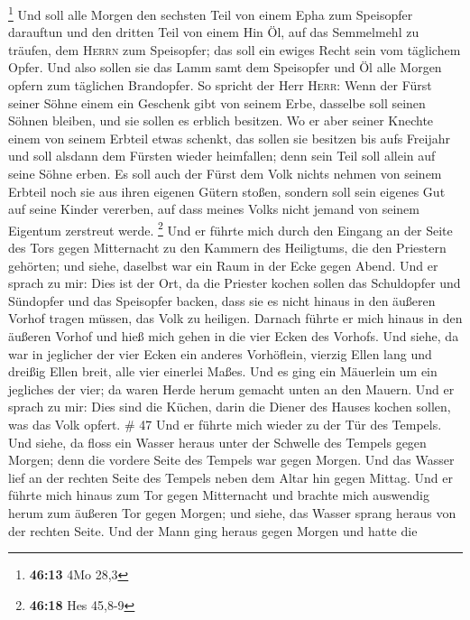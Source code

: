 \footnote{\textbf{46:13} 4Mo 28,3}  Und soll alle Morgen
den sechsten Teil von einem Epha zum Speisopfer darauftun und den
dritten Teil von einem Hin Öl, auf das Semmelmehl zu träufen, dem
\textsc{Herrn} zum Speisopfer; das soll ein ewiges Recht sein vom
täglichem Opfer.  Und also sollen sie das Lamm samt dem
Speisopfer und Öl alle Morgen opfern zum täglichen Brandopfer.
 So spricht der Herr \textsc{Herr}: Wenn der Fürst seiner
Söhne einem ein Geschenk gibt von seinem Erbe, dasselbe soll seinen
Söhnen bleiben, und sie sollen es erblich besitzen.  Wo
er aber seiner Knechte einem von seinem Erbteil etwas schenkt, das
sollen sie besitzen bis aufs Freijahr und soll alsdann dem Fürsten
wieder heimfallen; denn sein Teil soll allein auf seine Söhne erben.
 Es soll auch der Fürst dem Volk nichts nehmen von seinem
Erbteil noch sie aus ihren eigenen Gütern stoßen, sondern soll sein
eigenes Gut auf seine Kinder vererben, auf dass meines Volks nicht
jemand von seinem Eigentum zerstreut werde. \footnote{\textbf{46:18} Hes
  45,8-9}  Und er führte mich durch den Eingang an der
Seite des Tors gegen Mitternacht zu den Kammern des Heiligtums, die den
Priestern gehörten; und siehe, daselbst war ein Raum in der Ecke gegen
Abend.  Und er sprach zu mir: Dies ist der Ort, da die
Priester kochen sollen das Schuldopfer und Sündopfer und das Speisopfer
backen, dass sie es nicht hinaus in den äußeren Vorhof tragen müssen,
das Volk zu heiligen.  Darnach führte er mich hinaus in
den äußeren Vorhof und hieß mich gehen in die vier Ecken des Vorhofs.
 Und siehe, da war in jeglicher der vier Ecken ein
anderes Vorhöflein, vierzig Ellen lang und dreißig Ellen breit, alle
vier einerlei Maßes.  Und es ging ein Mäuerlein um ein
jegliches der vier; da waren Herde herum gemacht unten an den Mauern.
 Und er sprach zu mir: Dies sind die Küchen, darin die
Diener des Hauses kochen sollen, was das Volk opfert. \# 47
 Und er führte mich wieder zu der Tür des Tempels. Und
siehe, da floss ein Wasser heraus unter der Schwelle des Tempels gegen
Morgen; denn die vordere Seite des Tempels war gegen Morgen. Und das
Wasser lief an der rechten Seite des Tempels neben dem Altar hin gegen
Mittag.  Und er führte mich hinaus zum Tor gegen
Mitternacht und brachte mich auswendig herum zum äußeren Tor gegen
Morgen; und siehe, das Wasser sprang heraus von der rechten Seite.
 Und der Mann ging heraus gegen Morgen und hatte die
